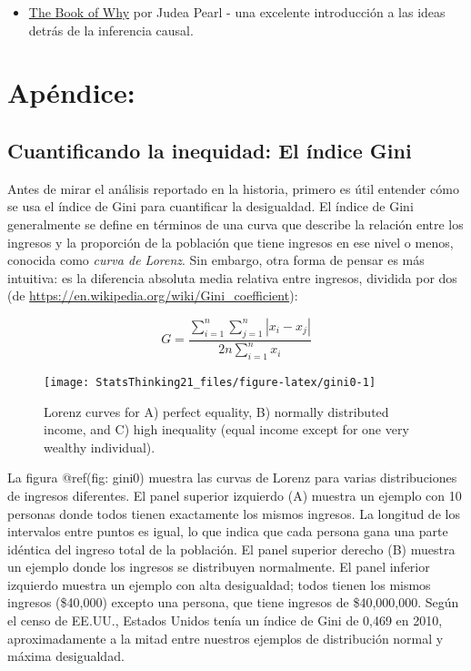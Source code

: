 \documentclass[
  12pt,
]{book}
\providecommand{\tightlist}{%
  \setlength{\itemsep}{0pt}\setlength{\parskip}{0pt}}
\theoremstyle{definition}
\theoremstyle{definition}
\theoremstyle{definition}
\theoremstyle{remark}
\begin{document}
\begin{itemize}
\tightlist
\item
  \href{http://bayes.cs.ucla.edu/WHY/}{The Book of Why} por Judea Pearl - una excelente introducción a las ideas detrás de la inferencia causal.
\end{itemize}

\hypertarget{apuxe9ndice}{%
\section{Apéndice:}\label{apuxe9ndice}}

\hypertarget{cuantificando-la-inequidad-el-uxedndice-gini}{%
\subsection{Cuantificando la inequidad: El índice Gini}\label{cuantificando-la-inequidad-el-uxedndice-gini}}

Antes de mirar el análisis reportado en la historia, primero es útil entender cómo se usa el índice de Gini para cuantificar la desigualdad. El índice de Gini generalmente se define en términos de una curva que describe la relación entre los ingresos y la proporción de la población que tiene ingresos en ese nivel o menos, conocida como \emph{curva de Lorenz}. Sin embargo, otra forma de pensar es más intuitiva: es la diferencia absoluta media relativa entre ingresos, dividida por dos (de \url{https://en.wikipedia.org/wiki/Gini_coefficient}):

\[
G = \frac{\displaystyle{\sum_{i=1}^n \sum_{j=1}^n \left| x_i - x_j \right|}}{\displaystyle{2n\sum_{i=1}^n x_i}} 
\]

\begin{figure}
\texttt{[image: StatsThinking21\_files/figure-latex/gini0-1]} \caption{Lorenz curves for A) perfect equality, B) normally distributed income, and C) high inequality (equal income except for one very wealthy individual).}\label{fig:gini0}
\end{figure}

La figura @ref(fig: gini0) muestra las curvas de Lorenz para varias distribuciones de ingresos diferentes. El panel superior izquierdo (A) muestra un ejemplo con 10 personas donde todos tienen exactamente los mismos ingresos. La longitud de los intervalos entre puntos es igual, lo que indica que cada persona gana una parte idéntica del ingreso total de la población. El panel superior derecho (B) muestra un ejemplo donde los ingresos se distribuyen normalmente. El panel inferior izquierdo muestra un ejemplo con alta desigualdad; todos tienen los mismos ingresos (\$40,000) excepto una persona, que tiene ingresos de \$40,000,000. Según el censo de EE.UU., Estados Unidos tenía un índice de Gini de 0,469 en 2010, aproximadamente a la mitad entre nuestros ejemplos de distribución normal y máxima desigualdad.
\end{document}
